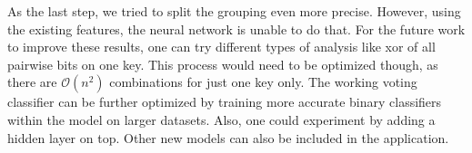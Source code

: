 As the last step, we tried to split the grouping even more precise. However, using the existing features, the neural network is unable to do that. For the future work to improve these results, one can try different types of analysis like xor of all pairwise bits on one key. This process would need to be optimized though, as there are $\mathcal{O}(n^2)$ combinations for just one key only. The working voting classifier can be further optimized by training more accurate binary classifiers within the model on larger datasets. Also, one could experiment by adding a hidden layer on top. Other new models can also be included in the application.
